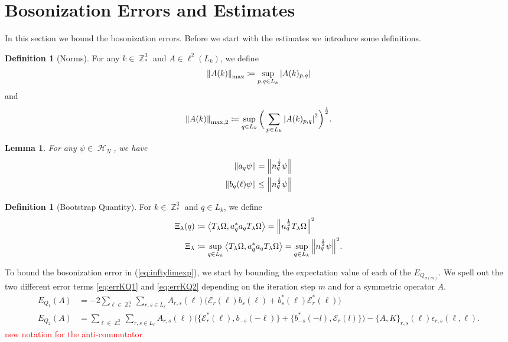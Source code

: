 \documentclass[sn-mathphys, Numbered ,a4paper]{sn-jnl}%
\DeclareMathOperator{\Z}{\mathbb{Z}}
\DeclareMathOperator{\HH}{\mathcal{H}}
\newcommand{\half}{\frac{1}{2}}
\theoremstyle{plain}
\newtheorem{lemma}[theorem]{Lemma}
\theoremstyle{definition}
\newtheorem{definition}[theorem]{Definition}
\theoremstyle{remark}
\theoremstyle{plain}
\theoremstyle{definition}
\theoremstyle{remark}
\begin{document}
\section{Bosonization Errors and Estimates}
In this section we bound the bosonization errors. Before we start with the estimates we introduce some definitions.

\begin{definition}[Norms]
    For any $k \in \Z^3_*$ and $A\in \ell^2(L_k)$, we define
      \begin{equation}
          \norm{A(k)}_{\mathrm{max}} \coloneq \sup\limits_{p,q \in L_k}\abs{A(k)_{p,q}}
      \end{equation}
      and
      \begin{equation}
          \norm{A(k)}_{\mathrm{max},2} \coloneq \sup\limits_{q \in L_k}\bigg(\sum\limits_{p \in L_k}\abs{A(k)_{p,q}}^2\bigg)^\half.
      \end{equation}
\end{definition}
\begin{lemma}
	For any $\psi \in \HH_N$, we have 
	\begin{align}
		\norm{a_q\psi}&= \norm{n_q^\half\psi} \\
		\norm{b_q(\ell)\psi}&\leq \norm{n_q^\half\psi}
	\end{align}
\end{lemma}
\begin{definition}[Bootstrap Quantity]
 For $k \in \Z^3_*$ and $q\in L_k$, we define 
    \begin{align}
        \Xi_\lambda(q) &\coloneq \expval{T_\lambda\Omega, a^*_qa_qT_\lambda\Omega} = \norm{n_q^\half T_{\lambda}\Omega}^2\\
        \Xi_\lambda &\coloneq \sup\limits_{q \in L_k}\expval{T_\lambda\Omega, a^*_qa_qT_\lambda\Omega} = \sup\limits_{q \in L_k}\norm{n_q^\half\psi}^2.
    \end{align}
\end{definition}

To bound the bosonization error in (\ref{eq:inftylimexp}), we start by bounding the expectation value of each of the $E_{Q_{\sigma(m)}}$. We spell out the two different error terms \eqref{eq:errKQ1} and \eqref{eq:errKQ2} depending on the iteration step $m$ and for a symmetric operator $A$.
\begin{align}
     E_{Q_1}(A)&=- 2 \sum\limits_{\ell \in \Z^3_*}\sum\limits_{r,s \in L_{\ell}}A_{r,s}(\ell)\Big(\mathcal{E}_{r}(\ell)b_{s}(\ell) + b^*_{s}(\ell)\mathcal{E}^*_{r}(\ell)\Big)\nonumber\\ 
    E_{Q_2}(A) &=
        \sum\limits_{\ell \in \Z^3_*}\sum\limits_{r,s \in L_{\ell}}A_{r,s}(\ell)\Big(\big\{\mathcal{E}^*_{r}(\ell), b_{-s}(-\ell)\big\} + \big\{ b^*_{-s}(-l),\mathcal{E}_r(l)\big\}\Big) - \big\{A,K\big\}_{r,s}(\ell)\epsilon_{r,s}(\ell,\ell) .\nonumber 
\end{align}
\textcolor{red}{new notation for the anti-commutator}
\end{document}
